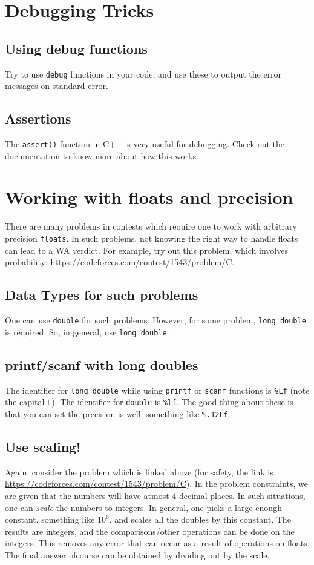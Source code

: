 \documentclass[12pt,a4paper]{amsart}
\numberwithin{equation}{section}
\theoremstyle{definition}
\begin{document}
\section{Debugging Tricks}
\subsection{Using debug functions} Try to use \verb|debug| functions in your code, and use these to output the error messages on standard error. 

\subsection{Assertions} The \verb|assert()| function in C++ is very useful for debugging. Check out the \href{https://www.cplusplus.com/reference/cassert/assert/}{documentation} to know more about how this works.

\section{Working with floats and precision}

\noindent There are many problems in contests which require one to work with arbitrary precision \verb|floats|. In such problems, not knowing the right way to handle floats can lead to a WA verdict. For example, try out this problem, which involves probability: \url{https://codeforces.com/contest/1543/problem/C}. 

\subsection{Data Types for such problems} One can use \verb|double| for such problems. However, for some problem, \verb|long double| is required. So, in general, use \verb|long double|. 

\subsection{printf/scanf with long doubles} The identifier for \verb|long double| while using \verb|printf| or \verb|scanf| functions is \verb|%Lf| (note the capital \verb|L|). The identifier for \verb|double| is \verb|%lf|. The good thing about these is that you can set the precision is well: something like \verb|%.12Lf|. 

\subsection{Use scaling!} Again, consider the problem which is linked above (for safety, the link is \url{https://codeforces.com/contest/1543/problem/C}). In the problem constraints, we are given that the numbers will have atmost 4 decimal places. In such situations, one can \textit{scale} the numbers to integers. In general, one picks a large enough constant, something like $10^6$, and scales all the doubles by this constant. The results are integers, and the comparisons/other operations can be done on the integers. This removes any error that can occur as a result of operations on floats. The final answer ofcourse can be obtained by dividing out by the scale. 
\end{document}

